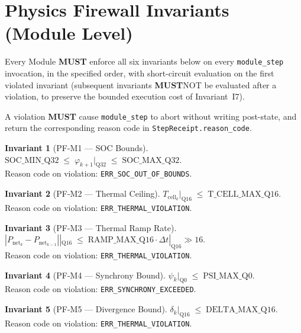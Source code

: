 \documentclass[11pt,letterpaper]{article}
\theoremstyle{definition}
\newtheorem{invariant}{Invariant}[section]
\newcommand{\MUST}{\textbf{MUST}}
\newcommand{\ph}{\varphi}       %
\newcommand{\sy}{\psi}          %
\newcommand{\dv}{\delta}        %
\newcommand{\Pnet}{P_{\mathrm{net}}}
\newcommand{\Tcell}{T_{\mathrm{cell}}}
\newcommand{\Dt}{\Delta t}
\begin{document}
\section{Physics Firewall Invariants (Module Level)}
\label{sec:invariants}

Every Module \MUST{} enforce all six invariants below on every \texttt{module\_step} invocation, in the specified order, with short-circuit evaluation on the first violated invariant (subsequent invariants \MUST NOT{} be evaluated after a violation, to preserve the bounded execution cost of Invariant~I7).

A violation \MUST{} cause \texttt{module\_step} to abort without writing post-state, and return the corresponding reason code in \texttt{StepReceipt.reason\_code}.

\begin{invariant}[PF-M1 — SOC Bounds]
\label{inv:pfm1}
$\mathrm{SOC\_MIN\_Q32} \;\le\; \ph_{k+1}|_{\mathrm{Q32}} \;\le\; \mathrm{SOC\_MAX\_Q32}$. \\
Reason code on violation: \texttt{ERR\_SOC\_OUT\_OF\_BOUNDS}.
\end{invariant}

\begin{invariant}[PF-M2 — Thermal Ceiling]
\label{inv:pfm2}
$\Tcell_k|_{\mathrm{Q16}} \;\le\; \mathrm{T\_CELL\_MAX\_Q16}$. \\
Reason code on violation: \texttt{ERR\_THERMAL\_VIOLATION}.
\end{invariant}

\begin{invariant}[PF-M3 — Thermal Ramp Rate]
\label{inv:pfm3}
$|\Pnet_k - \Pnet_{k-1}||_{\mathrm{Q16}} \;\le\; \mathrm{RAMP\_MAX\_Q16} \cdot \Dt|_{\mathrm{Q16}} \gg 16$. \\
Reason code on violation: \texttt{ERR\_THERMAL\_VIOLATION}.
\end{invariant}

\begin{invariant}[PF-M4 — Synchrony Bound]
\label{inv:pfm4}
$\sy_k|_{\mathrm{Q0}} \;\le\; \mathrm{PSI\_MAX\_Q0}$. \\
Reason code on violation: \texttt{ERR\_SYNCHRONY\_EXCEEDED}.
\end{invariant}

\begin{invariant}[PF-M5 — Divergence Bound]
\label{inv:pfm5}
$\dv_k|_{\mathrm{Q16}} \;\le\; \mathrm{DELTA\_MAX\_Q16}$. \\
Reason code on violation: \texttt{ERR\_THERMAL\_VIOLATION}.
\end{invariant}
\end{document}
